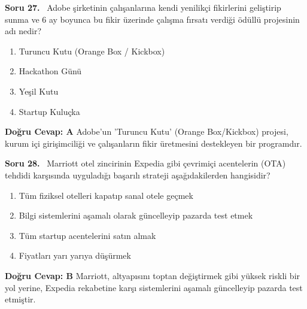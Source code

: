 \documentclass[11pt,a4paper,openany]{book}
\begin{document}
\needspace{5cm}
\vspace{8pt}
\noindent\textbf{\large\sffamily Soru 27.} \ Adobe şirketinin çalışanlarına kendi yenilikçi fikirlerini geliştirip sunma ve 6 ay boyunca bu fikir üzerinde çalışma fırsatı verdiği ödüllü projesinin adı nedir?
\begin{enumerate}[label=\Alph*), leftmargin=25pt, topsep=4pt, itemsep=2pt]
    \item Turuncu Kutu (Orange Box / Kickbox)
    \item Hackathon Günü
    \item Yeşil Kutu
    \item Startup Kuluçka
\end{enumerate}
\vspace{4pt}
\begin{tcolorbox}[title=Cevap ve Açıklama, colback=gray!3!white, colframe=primarycolor!90!black, arc=2mm, fonttitle=\bfseries\sffamily, top=6pt, bottom=6pt]
    \textbf{Doğru Cevap: A}
    \vspace{2pt}
    Adobe'un 'Turuncu Kutu' (Orange Box/Kickbox) projesi, kurum içi girişimciliği ve çalışanların fikir üretmesini destekleyen bir programdır.
\end{tcolorbox}
\vspace{10pt}

\needspace{5cm}
\vspace{8pt}
\noindent\textbf{\large\sffamily Soru 28.} \ Marriott otel zincirinin Expedia gibi çevrimiçi acentelerin (OTA) tehdidi karşısında uyguladığı başarılı strateji aşağıdakilerden hangisidir?
\begin{enumerate}[label=\Alph*), leftmargin=25pt, topsep=4pt, itemsep=2pt]
    \item Tüm fiziksel otelleri kapatıp sanal otele geçmek
    \item Bilgi sistemlerini aşamalı olarak güncelleyip pazarda test etmek
    \item Tüm startup acentelerini satın almak
    \item Fiyatları yarı yarıya düşürmek
\end{enumerate}
\vspace{4pt}
\begin{tcolorbox}[title=Cevap ve Açıklama, colback=gray!3!white, colframe=primarycolor!90!black, arc=2mm, fonttitle=\bfseries\sffamily, top=6pt, bottom=6pt]
    \textbf{Doğru Cevap: B}
    \vspace{2pt}
    Marriott, altyapısını toptan değiştirmek gibi yüksek riskli bir yol yerine, Expedia rekabetine karşı sistemlerini aşamalı güncelleyip pazarda test etmiştir.
\end{tcolorbox}
\vspace{10pt}
\end{document}
